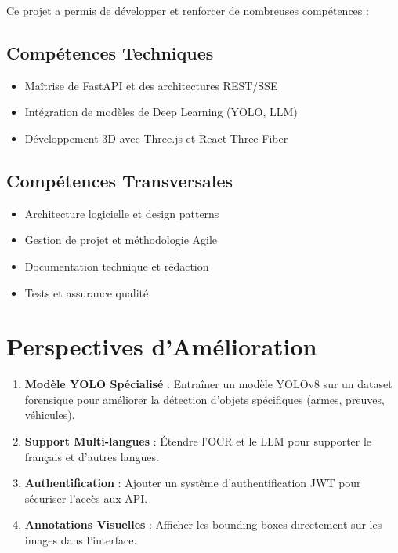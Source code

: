 Ce projet a permis de développer et renforcer de nombreuses compétences :

\subsection{Compétences Techniques}

\begin{itemize}
    \item Maîtrise de FastAPI et des architectures REST/SSE
    \item Intégration de modèles de Deep Learning (YOLO, LLM)
    \item Développement 3D avec Three.js et React Three Fiber

\end{itemize}

\subsection{Compétences Transversales}

\begin{itemize}
    \item Architecture logicielle et design patterns
    \item Gestion de projet et méthodologie Agile
    \item Documentation technique et rédaction
    \item Tests et assurance qualité
\end{itemize}

\section{Perspectives d'Amélioration}
\begin{enumerate}
    \item \textbf{Modèle YOLO Spécialisé} : Entraîner un modèle YOLOv8 sur un dataset forensique pour améliorer la détection d'objets spécifiques (armes, preuves, véhicules).
    
    \item \textbf{Support Multi-langues} : Étendre l'OCR et le LLM pour supporter le français et d'autres langues.
    
    \item \textbf{Authentification} : Ajouter un système d'authentification JWT pour sécuriser l'accès aux API.
    
    \item \textbf{Annotations Visuelles} : Afficher les bounding boxes directement sur les images dans l'interface.
\end{enumerate}

